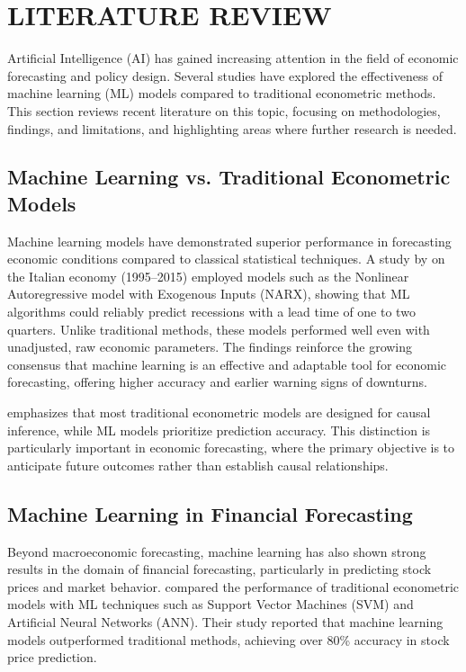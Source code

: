 \chapter{\uppercase{Literature Review}}
\justifying
\label{chap:literature-review}

Artificial Intelligence (AI) has gained increasing attention in the field of economic forecasting and policy design.
Several studies have explored the effectiveness of machine learning (ML) models compared to traditional econometric methods.
This section reviews recent literature on this topic, focusing on methodologies, findings, and limitations, and highlighting areas where further research is needed.

\section{Machine Learning vs. Traditional Econometric Models}
\label{sec:ml-vs-traditional-econometric-models}

Machine learning models have demonstrated superior performance in forecasting economic conditions compared to
classical statistical techniques. A study by \citet{HarishParuchuri} on the Italian economy (1995–2015) employed models such as the
Nonlinear Autoregressive model with Exogenous Inputs (NARX), showing that ML algorithms could reliably predict
recessions with a lead time of one to two quarters. Unlike traditional methods, these models performed well even
with unadjusted, raw economic parameters. The findings reinforce the growing consensus that machine learning is an
effective and adaptable tool for economic forecasting, offering higher accuracy and earlier warning signs of downturns.

\citet{Varian2014-ez} emphasizes that most traditional econometric models are designed for causal inference, while ML models prioritize prediction accuracy.
This distinction is particularly important in economic forecasting, where the primary objective is to anticipate future outcomes rather than establish causal relationships.

\section{Machine Learning in Financial Forecasting}
\label{sec:ml-in-financial-forecasting}

Beyond macroeconomic forecasting, machine learning has also shown strong results in the domain of financial forecasting,
particularly in predicting stock prices and market behavior. \citet{Hsu2016-in} compared the performance of traditional econometric models
with ML techniques such as Support Vector Machines (SVM) and Artificial Neural Networks (ANN).
Their study reported that machine learning models outperformed traditional methods, achieving over 80\% accuracy in stock price prediction.

